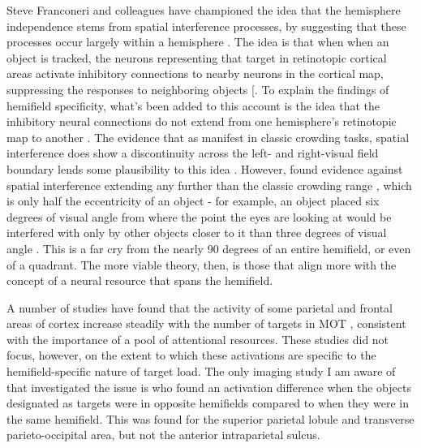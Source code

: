 \documentclass[
]{book}
\begin{document}
Steve Franconeri and colleagues have championed the idea that the hemisphere independence stems from spatial interference processes, by suggesting that these processes occur largely within a hemisphere \citep{franconeriNatureStatusVisual2013}. The idea is that when when an object is tracked, the neurons representing that target in retinotopic cortical areas activate inhibitory connections to nearby neurons in the cortical map, suppressing the responses to neighboring objects {[}\citet{carlsonQuadranticDeficitReveals2007}. To explain the findings of hemifield specificity, what's been added to this account is the idea that the inhibitory neural connections do not extend from one hemisphere's retinotopic map to another \citep{franconeriFlexibleCognitiveResources2013}. The evidence that as manifest in classic crowding tasks, spatial interference does show a discontinuity across the left- and right-visual field boundary lends some plausibility to this idea \citep{liuReductionCrowdingEffect2009}. However, \citet{holcombeObjectTrackingAbsence2014} found evidence against spatial interference extending any further than the classic crowding range , which is only half the eccentricity of an object - for example, an object placed six degrees of visual angle from where the point the eyes are looking at would be interfered with only by other objects closer to it than three degrees of visual angle \citep{boumaInteractionEffectsParafoveal1970a}. This is a far cry from the nearly 90 degrees of an entire hemifield, or even of a quadrant. The more viable theory, then, is those that align more with the concept of a neural resource that spans the hemifield.

A number of studies have found that the activity of some parietal and frontal areas of cortex increase steadily with the number of targets in MOT \citep{culhamAttentionResponseFunctions2001, howeUsingFMRIDistinguish2009, jovicichBrainAreasSpecific2001, alnaesPupilSizeSignals2014, nummenmaaCorticalCircuitBinding2017}, consistent with the importance of a pool of attentional resources. These studies did not focus, however, on the extent to which these activations are specific to the hemifield-specific nature of target load. The only imaging study I am aware of that investigated the issue is \citet{shimNumberAttentionalFoci2010} who found an activation difference when the objects designated as targets were in opposite hemifields compared to when they were in the same hemifield. This was found for the superior parietal lobule and transverse parieto-occipital area, but not the anterior intraparietal sulcus.
\end{document}

